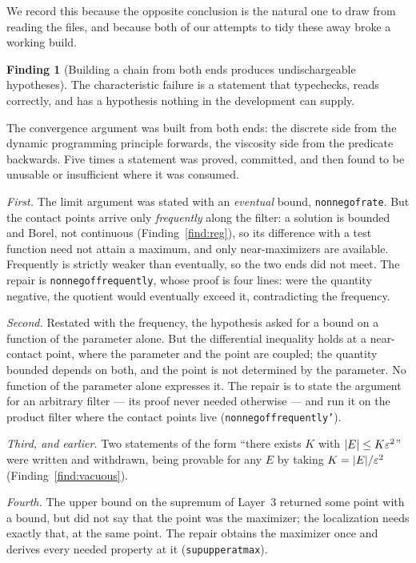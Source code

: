 \documentclass[11pt,reqno]{amsart}
\newcommand{\LEANREF}[1]{\texttt{\small\def\_{\textunderscore\allowbreak}#1}}
\newcommand{\eps}{\varepsilon}
\DeclarePairedDelimiter{\abs}{\lvert}{\rvert}
\theoremstyle{plain}
\theoremstyle{definition}
\newtheorem{finding}[theorem]{Finding}
\begin{document}
We record this because the opposite conclusion is the natural one to draw from
reading the files, and because both of our attempts to tidy these away broke
a working build.

\begin{finding}[Building a chain from both ends produces undischargeable
hypotheses]\label{find:chain}
The characteristic failure is a statement that typechecks, reads correctly, and
has a hypothesis nothing in the development can supply.
\end{finding}

The convergence argument was built from both ends: the discrete side from the
dynamic programming principle forwards, the viscosity side from the predicate
backwards. Five times a statement was proved, committed, and then found to be
unusable or insufficient where it was consumed.

\emph{First.} The limit argument was stated with an \emph{eventual} bound,
\LEANREF{nonneg\_of\_rate}. But the contact points arrive only
\emph{frequently} along the filter: a solution is bounded and Borel, not
continuous (Finding~\ref{find:reg}), so its difference with a test
function need not attain a maximum, and only near-maximizers are available.
Frequently is strictly weaker than eventually, so the two ends did not meet.
The repair is \LEANREF{nonneg\_of\_frequently}, whose proof is four lines: were
the quantity negative, the quotient would eventually exceed it, contradicting
the frequency.

\emph{Second.} Restated with the frequency, the hypothesis asked for a bound on
a function of the parameter alone. But the differential inequality holds at a
near-contact point, where the parameter and the point are coupled; the quantity
bounded depends on both, and the point is not determined by the parameter. No
function of the parameter alone expresses it. The repair is to state the
argument for an arbitrary filter --- its proof never needed otherwise --- and
run it on the product filter where the contact points live
(\LEANREF{nonneg\_of\_frequently'}).

\emph{Third, and earlier.} Two statements of the form ``there exists $K$ with
$\abs{E} \le K\eps^2$'' were written and withdrawn, being provable for any $E$
by taking $K = \abs{E}/\eps^2$ (Finding~\ref{find:vacuous}).

\emph{Fourth.} The upper bound on the supremum of Layer~3 returned some point
with a bound, but did not say that the point was the maximizer; the
localization needs exactly that, at the same point. The repair obtains the
maximizer once and derives every needed property at it
(\LEANREF{sup\_upper\_at\_max}).
\end{document}
